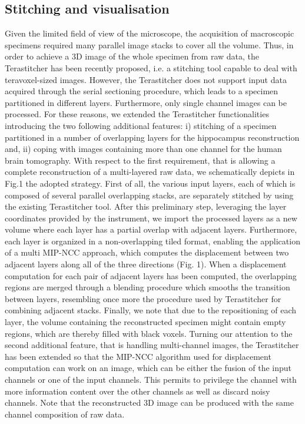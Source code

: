 \documentclass[12pt]{spieman}  %
\begin{document}
\subsection{Stitching and visualisation}
	
Given the limited field of view of the microscope, the acquisition of macroscopic specimens required many parallel image stacks to cover all the volume. Thus, in order to achieve a 3D image of the whole specimen from raw data, the Terastitcher\cite{Bria2012} has been recently proposed, i.e. a stitching tool capable to deal with teravoxel-sized images. However, the Terastitcher does not support input data acquired through the serial sectioning procedure, which leads to a specimen partitioned in different layers. Furthermore, only single channel images can be processed. For these reasons, we extended the Terastitcher functionalities introducing the two following additional features: i) stitching of a specimen partitioned in a number of overlapping layers for the hippocampus reconstruction and, ii) coping with images containing more than one channel for the human brain tomography.
With respect to the first requirement, that is allowing a complete reconstruction of a multi-layered raw data, we schematically depicts in Fig.1 the adopted strategy. First of all, the various input layers, each of which is composed of several parallel overlapping stacks, are separately stitched by using the existing Terastitcher tool. After this preliminary step,  leveraging the layer coordinates provided by the instrument, we import the processed layers as a new volume where each layer has a partial overlap with adjacent layers.  Furthermore, each layer is organized in a non-overlapping tiled format, enabling the application of a multi MIP-NCC approach\cite{Bria2012}, which computes the displacement  between two adjacent layers along all of the three directions (Fig. 1). When a displacement computation for each pair of adjacent layers has been computed, the overlapping regions are merged through a blending procedure which smooths the transition between layers, resembling once more the procedure used by Terastitcher for combining adjacent stacks. Finally, we note that due to the repositioning of each layer, the volume containing the reconstructed specimen might contain empty regions, which are thereby filled with black voxels. 
Turning our attention to the second additional feature, that is handling multi-channel images, the Terastitcher has been extended so that the MIP-NCC algorithm used for displacement computation can work on an image, which can be either 
the fusion of the input channels or one of the input channels. This permits to privilege the channel with more information content over the other channels as well as discard noisy channels. Note that the reconstructed 3D image can be produced with the same channel composition of raw data.
\end{document}
